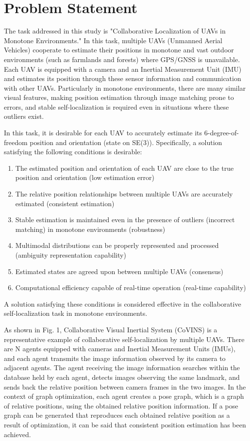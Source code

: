 \documentclass[a4paper,fleqn,10pt,twocolumn]{SICE_ISCS}
\begin{document}
\section{Problem Statement}
The task addressed in this study is "Collaborative Localization of UAVs in Monotone Environments." In this task, multiple UAVs (Unmanned Aerial Vehicles) cooperate to estimate their positions in monotone and vast outdoor environments (such as farmlands and forests) where GPS/GNSS is unavailable. Each UAV is equipped with a camera and an Inertial Measurement Unit (IMU) and estimates its position through these sensor information and communication with other UAVs. Particularly in monotone environments, there are many similar visual features, making position estimation through image matching prone to errors, and stable self-localization is required even in situations where these outliers exist.

In this task, it is desirable for each UAV to accurately estimate its 6-degree-of-freedom position and orientation (state on SE(3)). Specifically, a solution satisfying the following conditions is desirable:

\begin{enumerate}
\item The estimated position and orientation of each UAV are close to the true position and orientation (low estimation error)
\item The relative position relationships between multiple UAVs are accurately estimated (consistent estimation)
\item Stable estimation is maintained even in the presence of outliers (incorrect matching) in monotone environments (robustness)
\item Multimodal distributions can be properly represented and processed (ambiguity representation capability)
\item Estimated states are agreed upon between multiple UAVs (consensus)
\item Computational efficiency capable of real-time operation (real-time capability)
\end{enumerate}

A solution satisfying these conditions is considered effective in the collaborative self-localization task in monotone environments.

As shown in Fig. 1, Collaborative Visual Inertial System (CoVINS) is a representative example of collaborative self-localization by multiple UAVs. There are N agents equipped with cameras and Inertial Measurement Units (IMUs), and each agent transmits the image information observed by its camera to adjacent agents. The agent receiving the image information searches within the database held by each agent, detects images observing the same landmark, and sends back the relative position between camera frames in the two images. In the context of graph optimization, each agent creates a pose graph, which is a graph of relative positions, using the obtained relative position information. If a pose graph can be generated that reproduces each obtained relative position as a result of optimization, it can be said that consistent position estimation has been achieved.
\end{document}
